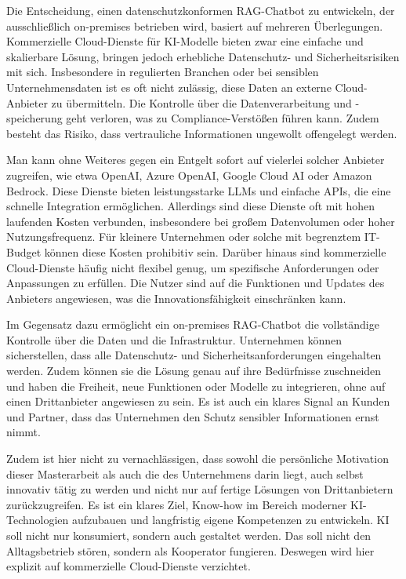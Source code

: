 Die Entscheidung, einen datenschutzkonformen RAG-Chatbot zu entwickeln, der ausschließlich on-premises betrieben wird, basiert auf mehreren Überlegungen.
Kommerzielle Cloud-Dienste für KI-Modelle bieten zwar eine einfache und skalierbare Lösung, bringen jedoch erhebliche Datenschutz- und Sicherheitsrisiken mit sich.
Insbesondere in regulierten Branchen oder bei sensiblen Unternehmensdaten ist es oft nicht zulässig, diese Daten an externe Cloud-Anbieter zu übermitteln.
Die Kontrolle über die Datenverarbeitung und -speicherung geht verloren, was zu Compliance-Verstößen führen kann.
Zudem besteht das Risiko, dass vertrauliche Informationen ungewollt offengelegt werden.

Man kann ohne Weiteres gegen ein Entgelt sofort auf vielerlei solcher Anbieter zugreifen, wie etwa OpenAI, Azure OpenAI, Google Cloud AI oder Amazon Bedrock.
Diese Dienste bieten leistungsstarke LLMs und einfache APIs, die eine schnelle Integration ermöglichen.
Allerdings sind diese Dienste oft mit hohen laufenden Kosten verbunden, insbesondere bei großem Datenvolumen oder hoher Nutzungsfrequenz.
Für kleinere Unternehmen oder solche mit begrenztem IT-Budget können diese Kosten prohibitiv sein.
Darüber hinaus sind kommerzielle Cloud-Dienste häufig nicht flexibel genug, um spezifische Anforderungen oder Anpassungen zu erfüllen.
Die Nutzer sind auf die Funktionen und Updates des Anbieters angewiesen, was die Innovationsfähigkeit einschränken kann.

Im Gegensatz dazu ermöglicht ein on-premises RAG-Chatbot die vollständige Kontrolle über die Daten und die Infrastruktur.
Unternehmen können sicherstellen, dass alle Datenschutz- und Sicherheitsanforderungen eingehalten werden.
Zudem können sie die Lösung genau auf ihre Bedürfnisse zuschneiden und haben die Freiheit, neue Funktionen oder Modelle zu integrieren, ohne auf einen Drittanbieter angewiesen zu sein.
Es ist auch ein klares Signal an Kunden und Partner, dass das Unternehmen den Schutz sensibler Informationen ernst nimmt.

Zudem ist hier nicht zu vernachlässigen, dass sowohl die persönliche Motivation dieser Masterarbeit als auch die des Unternehmens darin liegt, auch selbst innovativ tätig zu werden und nicht nur auf fertige Lösungen von Drittanbietern zurückzugreifen.
Es ist ein klares Ziel, Know-how im Bereich moderner KI-Technologien aufzubauen und langfristig eigene Kompetenzen zu entwickeln.
KI soll nicht nur konsumiert, sondern auch gestaltet werden.
Das soll nicht den Alltagsbetrieb stören, sondern als Kooperator fungieren.
Deswegen wird hier explizit auf kommerzielle Cloud-Dienste verzichtet.

